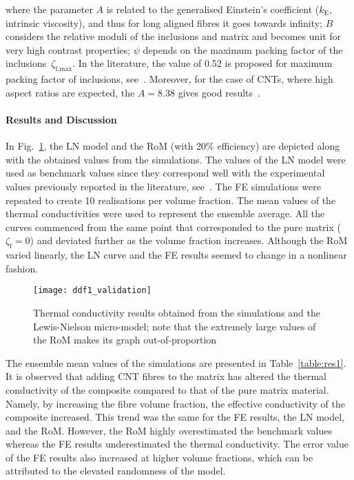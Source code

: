 	where the parameter $A$ is related to the generalised Einstein's coefficient ($k_\text{E}$, intrinsic viscosity), and thus for long aligned fibres it goes towards infinity; $B$ considers the relative moduli of the inclusions and matrix and becomes unit for very high contrast properties; $\psi$ depends on the maximum packing factor of the inclusions~$\zeta_\text{f,max}$. In the literature, the value of 0.52 is proposed for maximum packing factor of inclusions, see~\autocite{Halpin.1992,Nielsen.1994}. Moreover, for the case of CNTs, where high aspect ratios are expected, the $A=8.38$ gives good results~\autocite{Kostagiannakopoulou.2016,Zimmer.2012}. 
	
	\paragraph{Results and Discussion} In Fig.~\ref{figure:ddf1_validation}, the LN model and the RoM (with 20\% efficiency) are depicted along with the obtained values from the simulations. The values of the LN model were used as benchmark values since they correspond well with the experimental values previously reported in the literature, see~\autocite{Kostagiannakopoulou.2016,Zimmer.2012}. The FE simulations were repeated to create 10 realisations per volume fraction. The mean values of the thermal conductivities were used to represent the ensemble average. All the curves commenced from the same point that corresponded to the pure matrix ($\zeta_\text{f}=0$) and deviated further as the volume fraction increases. Although the RoM varied linearly, the LN curve and the FE results seemed to change in a nonlinear fashion.
\begin{figure}[!h]
\centering
\texttt{[image: ddf1\_validation]}
\caption{\red Thermal conductivity results obtained from the simulations and the Lewis-Nielson micro-model; note that the extremely large values of the RoM makes its graph out-of-proportion}\label{figure:ddf1_validation}
\end{figure}%
	
	The ensemble mean values of the simulations are presented in Table~\ref{table:res1}. It is observed that adding CNT fibres to the matrix has altered the thermal conductivity of the composite compared to that of the pure matrix material. Namely, by increasing the fibre volume fraction, the effective conductivity of the composite increased. This trend was the same for the FE results, the LN model, and the RoM. However, the RoM highly overestimated the benchmark values whereas the FE results underestimated the thermal conductivity. The error value of the FE results also increased at higher volume fractions, which can be attributed to the elevated randomness of the model.

